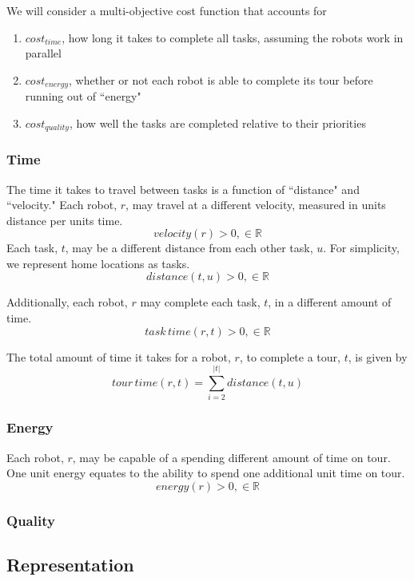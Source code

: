 \documentclass[a4paper]{article}
\begin{document}
We will consider a multi-objective cost function that accounts for
\begin{enumerate}
\item $\mathit{cost}_\mathit{time}$, how long it takes to complete all tasks, assuming the robots work in parallel
\item $\mathit{cost}_\mathit{energy}$, whether or not each robot is able to complete its tour before running out of ``energy"
\item $\mathit{cost}_\mathit{quality}$, how well the tasks are completed relative to their priorities
\end{enumerate}

\subsubsection{Time}

The time it takes to travel between tasks is a function of ``distance" and ``velocity." Each robot, $r$, may travel at a different velocity, measured in units distance per units time.
$$\mathit{velocity}(r) > 0, \in \mathbb{R}$$
Each task, $t$, may be a different distance from each other task, $u$. For simplicity, we represent home locations as tasks.
$$\mathit{distance}(t, u) > 0, \in \mathbb{R}$$

Additionally, each robot, $r$ may complete each task, $t$, in a different amount of time.
$$\mathit{task \, time}(r, t) > 0, \in \mathbb{R}$$

The total amount of time it takes for a robot, $r$, to complete a tour, $t$, is given by
$$
\mathit{tour \, time}(r, t) =
  \sum^|t|_{i=2}
  \mathit{distance}(t, u)
$$

\subsubsection{Energy}

Each robot, $r$, may be capable of a spending different amount of time on tour. One unit energy equates to the ability to spend one additional unit time on tour.
$$\mathit{energy}(r) > 0, \in \mathbb{R}$$

\subsubsection{Quality}

\subsection{Representation}
\end{document}
